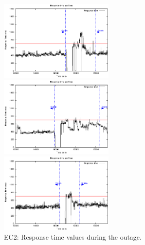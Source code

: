 \begin{figure}[htb]
	\begin{minipage}[b]{0.32\linewidth}
		\vspace{-4mm}
		\includegraphics[height=4cm]{images/exps2011/low/ec2/proxyDataPoints_output_filtered.eps}	
		\vspace{-4mm}
	\end{minipage}
	\hfill
	\begin{minipage}[b]{0.32\linewidth}
		\vspace{-4mm}
		\includegraphics[height=4cm]{images/exps2011/medium/ec2/proxyDataPoints_output_filtered.eps}
		\vspace{-4mm}
	\end{minipage}
\hfill
\begin{minipage}[b]{0.32\linewidth}
		\vspace{-4mm}
		\includegraphics[height=4cm]{images/exps2011/high/ec2/proxyDataPoints_output_filtered.eps}
		\vspace{-4mm}
	\end{minipage}
\caption{EC2: Response time values during the outage.}
\label{fig:EC2ResponseTime}
\end{figure}


